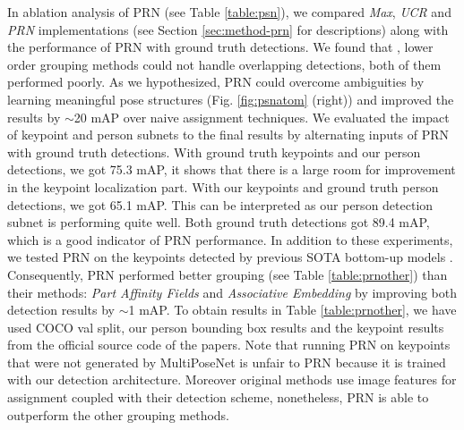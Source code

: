 \documentclass[runningheads]{llncs}
\begin{document}
\begin{table}
\begin{center}
\caption{PRN assignment results with non-grouped keypoints obtained from two bottom-up methods.}
\label{table:prnother}
\end{center}
\end{table}


In ablation analysis of PRN (see Table \ref{table:psn}), we compared \textit{Max}, \textit{UCR} and \textit{PRN} implementations (see Section \ref{sec:method-prn} for descriptions) along with the performance of PRN with ground truth detections. We found that , lower order grouping methods could not  handle overlapping detections, both of them performed poorly. As we hypothesized, PRN could overcome ambiguities by learning meaningful pose structures (Fig. \ref{fig:psnatom} (right)) and improved the results by $\sim$20 mAP over naive assignment techniques. We evaluated the impact of keypoint and person subnets to the final results by alternating inputs of PRN with ground truth detections. With ground truth keypoints and our person detections, we got 75.3 mAP,  it shows that there is a large room for improvement in the keypoint localization part. With our keypoints and ground truth person detections, we got 65.1 mAP. This can be interpreted as our person detection subnet is performing quite well. Both ground truth detections got 89.4 mAP, which is a good indicator of PRN performance. In addition to these experiments, we tested PRN on the keypoints detected by previous SOTA bottom-up models \cite{Cao2016,Newell2016b}. Consequently, PRN performed better grouping (see Table \ref{table:prnother}) than their methods: \textit{Part Affinity Fields}\cite{Cao2016} and \textit{Associative Embedding}\cite{Newell2016b} by improving both detection results by $\sim$1 mAP. To obtain results in Table \ref{table:prnother}, we have used COCO val split, our person bounding box results and the keypoint results from the official source code of the papers.     Note that running PRN on keypoints that were not generated by MultiPoseNet is unfair to PRN because it is trained with our detection architecture. Moreover original methods use image features for assignment coupled with their detection scheme, nonetheless, PRN is able to outperform the other grouping methods.    
\end{document}
